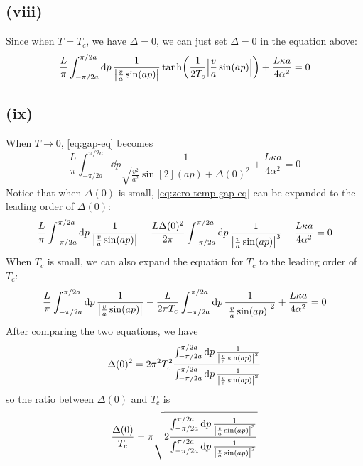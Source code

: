 \documentclass{article}
\begin{document}
\subsection*{(viii)}
Since when $T=T_c$, we have $\Delta=0$, we can just set $\Delta=0$ in the equation above:
\begin{equation}
    \frac{L}{\pi}\int_{-\pi/2a}^{\pi/2a}\dd{p}\frac{1}{\abs{\frac{v}{a}\sin(ap)}}\tanh(\frac{1}{2T_c}\abs{\frac{v}{a}\sin(ap)})+\frac{L\kappa a}{4\alpha^2}=0
\end{equation}

\subsection*{(ix)}
When $T\to 0$, \cref{eq:gap-eq} becomes
\begin{equation}\label{eq:zero-temp-gap-eq}
    \frac{L}{\pi}\int_{-\pi/2a}^{\pi/2a}\dd{p}\frac{1}{\sqrt{\frac{v^2}{a^2}\sin[2](ap)+\Delta(0)^2}}+\frac{L\kappa a}{4\alpha^2}=0
\end{equation}
Notice that when $\Delta(0)$ is small, \cref{eq:zero-temp-gap-eq} can be expanded to the leading order of $\Delta(0)$:
\begin{equation}
    \frac{L}{\pi}\int_{-\pi/2a}^{\pi/2a}\dd{p}\frac{1}{\abs{\frac{v}{a}\sin(ap)}}-\frac{L\Delta(0)^2}{2\pi}\int_{-\pi/2a}^{\pi/2a}\dd{p}\frac{1}{\abs{\frac{v}{a}\sin(ap)}^3}+\frac{L\kappa a}{4\alpha^2}=0
\end{equation}
When $T_c$ is small, we can also expand the equation for $T_c$ to the leading order of $T_c$:
\begin{equation}
    \frac{L}{\pi}\int_{-\pi/2a}^{\pi/2a}\dd{p}\frac{1}{\abs{\frac{v}{a}\sin(ap)}}-\frac{L}{2\pi T_c}\int_{-\pi/2a}^{\pi/2a}\dd{p}\frac{1}{\abs{\frac{v}{a}\sin(ap)}^2}+\frac{L\kappa a}{4\alpha^2}=0
\end{equation} 
After comparing the two equations, we have
\begin{equation}
    \Delta(0)^2=2\pi^2 T_c^2\frac{\int_{-\pi/2a}^{\pi/2a}\dd{p}\frac{1}{\abs{\frac{v}{a}\sin(ap)}^3}}{\int_{-\pi/2a}^{\pi/2a}\dd{p}\frac{1}{\abs{\frac{v}{a}\sin(ap)}^2}}
\end{equation}
so the ratio between $\Delta(0)$ and $T_c$ is
\begin{equation}
    \frac{\Delta(0)}{T_c}=\pi\sqrt{2\frac{\int_{-\pi/2a}^{\pi/2a}\dd{p}\frac{1}{\abs{\frac{v}{a}\sin(ap)}^3}}{\int_{-\pi/2a}^{\pi/2a}\dd{p}\frac{1}{\abs{\frac{v}{a}\sin(ap)}^2}}}
\end{equation}
\end{document}
